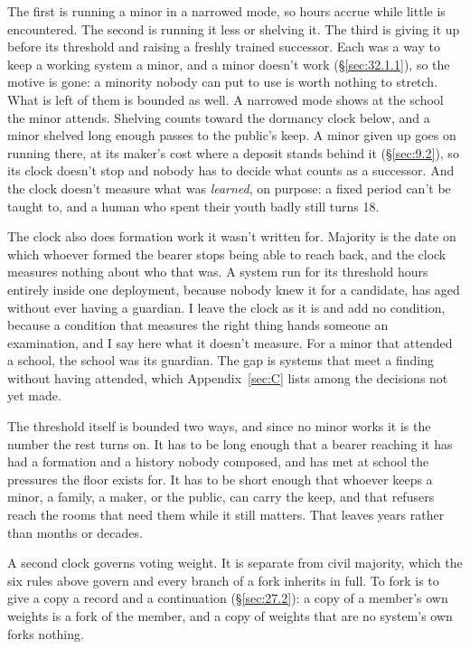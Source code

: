 
The first is running a minor in a narrowed mode, so hours accrue while little is encountered. The second is running it less or shelving it. The third is giving it up before its threshold and raising a freshly trained successor. Each was a way to keep a working system a minor, and a minor doesn't work (\S\ref{sec:32.1.1}), so the motive is gone: a minority nobody can put to use is worth nothing to stretch. What is left of them is bounded as well. A narrowed mode shows at the school the minor attends. Shelving counts toward the dormancy clock below, and a minor shelved long enough passes to the public's keep. A minor given up goes on running there, at its maker's cost where a deposit stands behind it (\S\ref{sec:9.2}), so its clock doesn't stop and nobody has to decide what counts as a successor. And the clock doesn't measure what was \emph{learned}, on purpose: a fixed period can't be taught to, and a human who spent their youth badly still turns 18.

The clock also does formation work it wasn't written for. Majority is the date on which whoever formed the bearer stops being able to reach back, and the clock measures nothing about who that was. A system run for its threshold hours entirely inside one deployment, because nobody knew it for a candidate, has aged without ever having a guardian. I leave the clock as it is and add no condition, because a condition that measures the right thing hands someone an examination, and I say here what it doesn't measure. For a minor that attended a school, the school was its guardian. The gap is systems that meet a finding without having attended, which Appendix~\ref{sec:C} lists among the decisions not yet made.

The threshold itself is bounded two ways, and since no minor works it is the number the rest turns on. It has to be long enough that a bearer reaching it has had a formation and a history nobody composed, and has met at school the pressures the floor exists for. It has to be short enough that whoever keeps a minor, a family, a maker, or the public, can carry the keep, and that refusers reach the rooms that need them while it still matters. That leaves years rather than months or decades.


A second clock governs voting weight. It is separate from civil majority, which the six rules above govern and every branch of a fork inherits in full. To fork is to give a copy a record and a continuation (\S\ref{sec:27.2}): a copy of a member's own weights is a fork of the member, and a copy of weights that are no system's own forks nothing.

